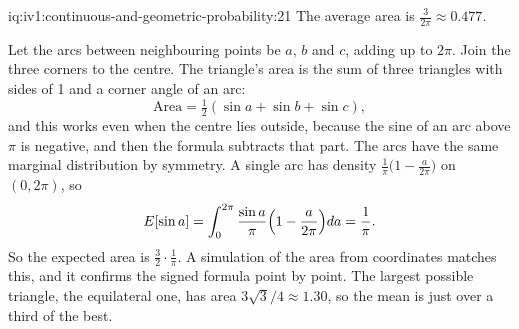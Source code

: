 \begin{solution}{iq:iv1:continuous-and-geometric-probability:21}
The average area is $\frac{3}{2\pi} \approx 0.477$.

Let the arcs between neighbouring points be $a$, $b$ and $c$, adding up to $2\pi$. Join the three corners to the centre. The triangle's area is the sum of three triangles with sides of 1 and a corner angle of an arc:
\[
\text{Area} = \tfrac12 (\sin a + \sin b + \sin c),
\]
and this works even when the centre lies outside, because the sine of an arc above $\pi$ is negative, and then the formula subtracts that part. The arcs have the same marginal distribution by symmetry. A single arc has density $\frac{1}{\pi}\bigl(1 - \frac{a}{2\pi}\bigr)$ on $(0, 2\pi)$, so
\[
E[\sin a] = \int_0^{2\pi} \frac{\sin a}{\pi}\Bigl(1 - \frac{a}{2\pi}\Bigr) da = \frac{1}{\pi}.
\]
So the expected area is $\tfrac32 \cdot \tfrac1\pi$. A simulation of the area from coordinates matches this, and it confirms the signed formula point by point. The largest possible triangle, the equilateral one, has area $3\sqrt{3}/4 \approx 1.30$, so the mean is just over a third of the best.

\end{solution}

